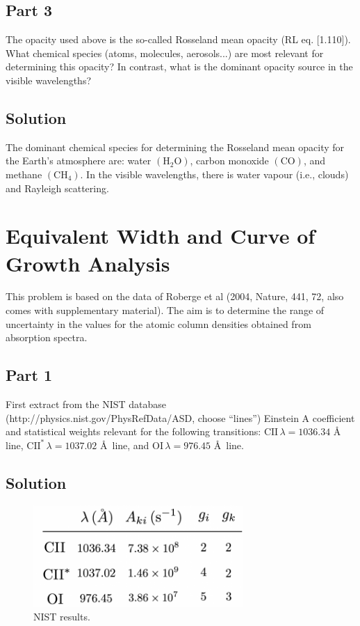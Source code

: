 \documentclass[12pt]{article}
\begin{document}
\subsection*{Part 3}

The opacity used above is the so-called Rosseland mean opacity (RL eq. [1.110]). What chemical species (atoms, molecules, aerosols...) are most relevant for determining this opacity? In contrast, what is the dominant opacity source in the visible wavelengths?

\subsection*{Solution}

The dominant chemical species for determining the Rosseland mean opacity for the Earth's atmosphere are: water $\mathrm{(H_2O)}$, carbon monoxide $\mathrm{(CO)}$, and methane $\mathrm{(CH_4)}$. In the visible wavelengths, there is water vapour (i.e., clouds) and Rayleigh scattering.

\section{Equivalent Width and Curve of Growth Analysis}

This problem is based on the data of Roberge et al (2004, Nature, 441, 72, also comes with supplementary material). The aim is to determine the range of uncertainty in the values for the atomic column densities obtained from absorption spectra.

\subsection*{Part 1}

First extract from the NIST database (http://physics.nist.gov/PhysRefData/ASD, choose “lines”) Einstein A coefficient and statistical weights relevant for the following transitions: $\mathrm{CII} \, \lambda = 1036.34$ \AA \, line, $\mathrm{CII^*} \, \lambda = 1037.02$ \AA \, line, and $\mathrm{OI} \, \lambda = 976.45$ \AA \, line.

\subsection*{Solution}

\begin{figure}[h] \label{fig:table}
\includegraphics[width=8cm]{table.png}
\centering
\caption{NIST results.}
\end{figure}
\end{document}
